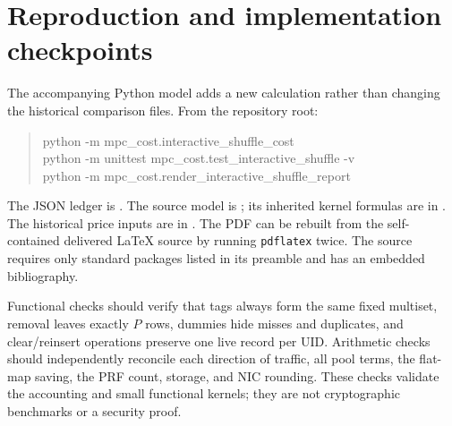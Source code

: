 \documentclass[11pt]{article}
\begin{document}
\section{Reproduction and implementation checkpoints}
The accompanying Python model adds a new calculation rather than changing
the historical comparison files. From the repository root:
\begin{quote}\small\ttfamily
python -m mpc\_cost.interactive\_shuffle\_cost\\
python -m unittest mpc\_cost.test\_interactive\_shuffle -v\\
python -m mpc\_cost.render\_interactive\_shuffle\_report
\end{quote}
The JSON ledger is .
The source model is ; its inherited
kernel formulas are in . The historical
price inputs are in .
The PDF can be rebuilt from the self-contained delivered \LaTeX{} source by
running \texttt{pdflatex} twice. The source requires only standard packages
listed in its preamble and has an embedded bibliography.

Functional checks should verify that tags always form the same fixed
multiset, removal leaves exactly $P$ rows, dummies hide misses and duplicates,
and clear/reinsert operations preserve one live record per UID. Arithmetic
checks should independently reconcile each direction of traffic, all pool
terms, the flat-map saving, the PRF count, storage, and NIC rounding. These
checks validate the accounting and small functional kernels; they are not
cryptographic benchmarks or a security proof.
\end{document}
